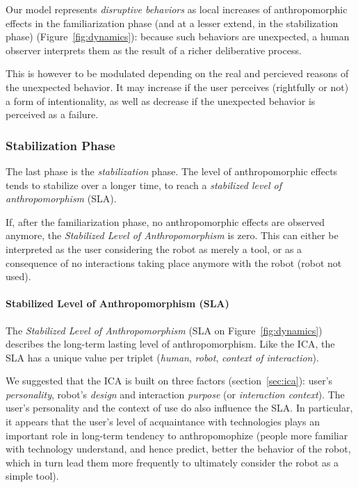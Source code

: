\documentclass{acm_proc_article-sp}
\begin{document}
Our model represents \emph{disruptive behaviors} as local increases of
anthropomorphic effects in the familiarization phase (and at a lesser extend,
in the stabilization phase) (Figure~\ref{fig:dynamics}): because such behaviors
are unexpected, a human observer interprets them as the result of a richer
deliberative process.

This is however to be modulated depending on the real and percieved reasons of
the unexpected behavior. It may increase if the user perceives (rightfully or
not) a form of intentionality, as well as decrease if the unexpected behavior
is perceived as a failure.

\subsubsection{Stabilization Phase}
\label{sec:stabilization}

The last phase is the \emph{stabilization} phase. The level of anthropomorphic
effects tends to stabilize over a longer time, to reach a \emph{stabilized
level of anthropomorphism} (SLA).

If, after the familiarization phase, no anthropomorphic effects are observed
anymore, the \emph{Stabilized Level of Anthropomorphism} is zero. This can
either be interpreted as the user considering the robot as merely a tool, or as
a consequence of no interactions taking place anymore with the robot (robot not
used).


\paragraph{Stabilized Level of Anthropomorphism (SLA)}

The \emph{Stabilized Level of Anthropomorphism} (SLA on
Figure~\ref{fig:dynamics}) describes the long-term lasting level of
anthropomorphism.  Like the ICA, the SLA has a unique value per triplet
(\emph{human}, \emph{robot}, \emph{context of interaction}).

We suggested that the ICA is built on three factors (section~\ref{sec:ica}):
user's \emph{personality}, robot's \emph{design} and interaction \emph{purpose}
(or \emph{interaction context}). The user's personality and the context of use
do also influence the SLA. In particular, it appears that the user's level of
acquaintance with technologies plays an important role in long-term tendency to
anthropomophize (people more familiar with technology understand, and hence
predict, better the behavior of the robot, which in turn lead them more
frequently to ultimately consider the robot as a simple tool).
\end{document}
